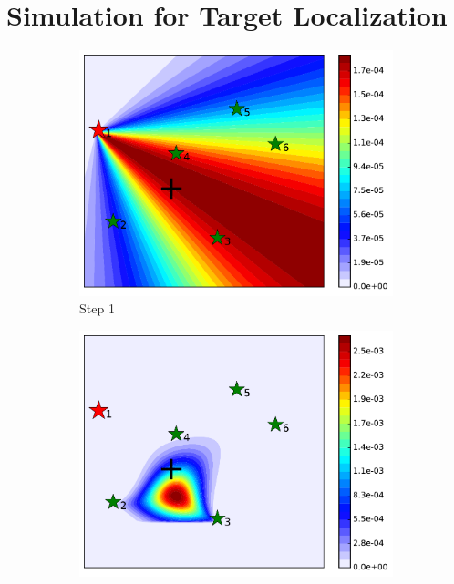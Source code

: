 \documentclass[journal]{IEEEtranTIE}
\theoremstyle{remark}
\begin{document}
	
	\section{Simulation for Target Localization}\label{sec:sim}
	
	\begin{figure}%
		\centering
		\begin{subfigure}[b]{0.21\textwidth}
			\includegraphics[width=\textwidth]{brg_sta_sen_sta_tar_rbt1_step1_16-TIE-3798}
			\caption{Step 1}\label{fig:sta_sen_sta_tar_sing1}
		\end{subfigure}
		\begin{subfigure}[b]{0.21\textwidth}
			\includegraphics[width=\textwidth]{brg_sta_sen_sta_tar_rbt1_step3_16-TIE-3798}

\end{subfigure}
\end{figure}
\end{document}

